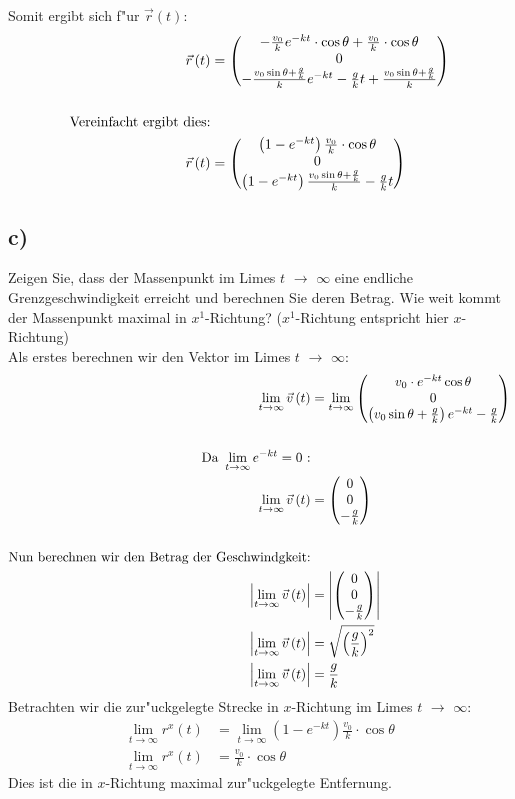 \documentclass{theozettel}
\begin{document}
Somit ergibt sich f"ur $\vec{r}\left(t\right)$:
\begin{align*}
\vec{r}\left(t\right)&=\mqty(-\frac{v_0}{k} e^{-kt}\cdot \cos\theta+\frac{v_0}{k}\cdot \cos\theta \\ 0 \\ -\frac{v_0\sin\theta +\frac{g}{k}}{k}e^{-kt}-\frac{g}{k}t+\frac{v_0\sin\theta +\frac{g}{k}}{k} )\\\\
\text{Vereinfacht ergibt dies:}\\
\vec{r}\left(t\right)&=\mqty(\left(1-e^{-kt}\right)\frac{v_0}{k}\cdot \cos\theta\\0\\\left(1-e^{-kt}\right)\frac{v_0\sin\theta +\frac{g}{k}}{k}-\frac{g}{k}t)
\end{align*}
\newpage
\subsection*{c)} Zeigen Sie, dass der Massenpunkt im Limes $t$ $\rightarrow$ $\infty$ eine endliche Grenzgeschwindigkeit erreicht und berechnen Sie deren Betrag. Wie weit kommt der Massenpunkt maximal in $x^1$-Richtung? ($x^1$-Richtung entspricht hier $x$-Richtung)\\
Als erstes berechnen wir den Vektor im Limes $t$ $\rightarrow$ $\infty$:
\begin{align*}
\lim_{t\rightarrow\infty}\vec{v}\left(t\right)&=\lim_{t\rightarrow\infty}\mqty(v_0\cdot e^{-kt}\cos\theta\\0\\\left(v_0\sin\theta+\frac{g}{k}\right)e^{-kt}-\frac{g}{k})\\\\
\text{Da} \ \lim_{t\rightarrow\infty}e^{-kt}=0 \ \text{:}&\\
\lim_{t\rightarrow\infty}\vec{v}\left(t\right)&=\mqty(0\\0\\-\frac{g}{k})\\\\
\text{Nun berechnen wir den Betrag der Geschwindgkeit:}&\\
\left|\lim_{t\rightarrow\infty}\vec{v}\left(t\right)\right|&=\left|\mqty(0\\0\\-\frac{g}{k})\right|\\
\left|\lim_{t\rightarrow\infty}\vec{v}\left(t\right)\right|&=\sqrt{\left(\frac{g}{k}\right)^2}\\
\left|\lim_{t\rightarrow\infty}\vec{v}\left(t\right)\right|&=\frac{g}{k}
\end{align*}
Betrachten wir die zur"uckgelegte Strecke in $x$-Richtung im Limes $t$ $\rightarrow$ $\infty$:
\begin{align*}
\lim_{t\rightarrow\infty}r^x\left(t\right)&=\lim_{t\rightarrow\infty}\left(1-e^{-kt}\right)\frac{v_0}{k}\cdot \cos\theta\\
\lim_{t\rightarrow\infty}r^x\left(t\right)&=\frac{v_0}{k}\cdot \cos\theta
\end{align*}
Dies ist die in $x$-Richtung maximal zur"uckgelegte Entfernung.
\newpage
\end{document}
